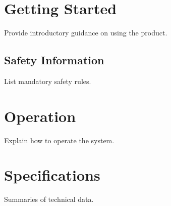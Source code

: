 \documentclass[
    language=english,
    doctype=manual,
    institution=none,
    titlestyle=book,
    oneside,
]{../../omnilatex}
\begin{document}
\maketitle

\tableofcontents

\chapter{Getting Started}
Provide introductory guidance on using the product.

\section{Safety Information}
List mandatory safety rules.

\chapter{Operation}
Explain how to operate the system.

\appendix
\chapter{Specifications}
Summaries of technical data.
\end{document}
